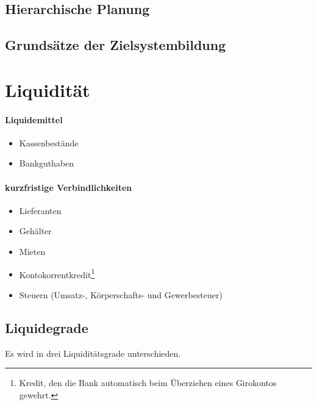 \documentclass[../main.tex]{subfiles}
\begin{document}
        \subsection{Hierarchische Planung}
            
        \subsection{Grundsätze der Zielsystembildung}
        
    \section{Liquidität}
        \paragraph{Liquidemittel}
            \begin{itemize}
                \item Kassenbestände
                \item Bankguthaben
            \end{itemize}
            
        \paragraph{kurzfristige Verbindlichkeiten}
            \begin{itemize}
                \item Lieferanten
                \item Gehälter
                \item Mieten
                \item Kontokorrentkredit\footnote{Kredit, den die Bank automatisch beim Überziehen eines Girokontos gewehrt.}
                \item Steuern (Umsatz-, Körperschafts- und Gewerbesteuer)
            \end{itemize}
    
        \subsection{Liquidegrade}
            Es wird in drei Liquiditätsgrade unterschieden.
            
\end{document}
